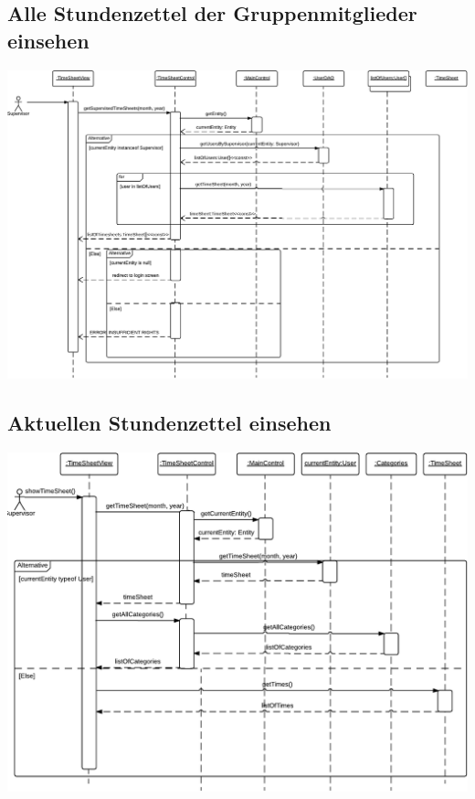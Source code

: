    \subsection{Alle Stundenzettel der Gruppenmitglieder einsehen}
        \includegraphics[width=\linewidth]{Diagramms/sequenzes/timesheets_of_all_supervised.pdf}\\
    \subsection{Aktuellen Stundenzettel einsehen}
        \includegraphics[width=\linewidth]{Diagramms/sequenzes/current_timesheet.pdf}\\
